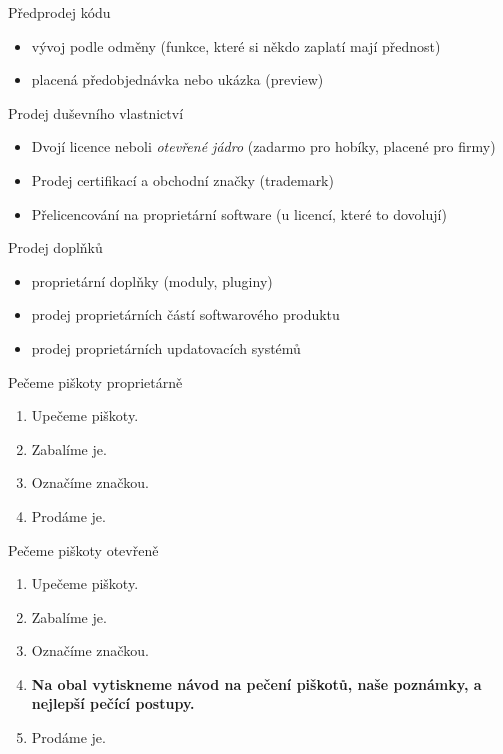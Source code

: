 \documentclass[11pt]{beamer}
\begin{document}
\begin{frame}{Předprodej kódu}
	\begin{itemize}
		\item vývoj podle odměny (funkce, které si někdo zaplatí mají přednost)
		\item placená předobjednávka nebo ukázka (preview)
	\end{itemize}
\end{frame}

\begin{frame}{Prodej duševního vlastnictví}
	\begin{itemize}
		\item Dvojí licence neboli \textit{otevřené jádro} (zadarmo pro hobíky, placené pro firmy)
		\item Prodej certifikací a obchodní značky (trademark)
		\item Přelicencování na proprietární software (u licencí, které to dovolují)
	\end{itemize}
\end{frame}

\begin{frame}{Prodej doplňků}
	\begin{itemize}
		\item proprietární doplňky (moduly, pluginy)
		\item prodej proprietárních částí softwarového produktu
		\item prodej proprietárních updatovacích systémů
	\end{itemize}
\end{frame}

\begin{frame}{Pečeme piškoty proprietárně}
	\begin{enumerate}
		\item Upečeme piškoty.
		\item Zabalíme je.
		\item Označíme značkou.
		\item Prodáme je.
	\end{enumerate}
\end{frame}

\begin{frame}{Pečeme piškoty otevřeně}
	\begin{enumerate}
		\item Upečeme piškoty.
		\item Zabalíme je.
		\item Označíme značkou.
		\item \textbf{Na obal vytiskneme návod na pečení piškotů, naše poznámky, a nejlepší pečící postupy.}
		\item Prodáme je.
	\end{enumerate}
\end{frame}
\end{document}
